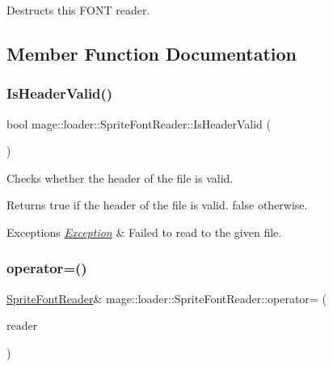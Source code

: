 Destructs this F\+O\+NT reader. 

\subsection{Member Function Documentation}
\hypertarget{classmage_1_1loader_1_1_sprite_font_reader_a6e8d452944d4a87a8e6f89ea6d4212f0}{}\label{classmage_1_1loader_1_1_sprite_font_reader_a6e8d452944d4a87a8e6f89ea6d4212f0} 
\subsubsection{\texorpdfstring{Is\+Header\+Valid()}{IsHeaderValid()}}
{\footnotesize\ttfamily bool mage\+::loader\+::\+Sprite\+Font\+Reader\+::\+Is\+Header\+Valid (\begin{DoxyParamCaption}{ }\end{DoxyParamCaption})\hspace{0.3cm}{\ttfamily [private]}}

Checks whether the header of the file is valid.

\begin{DoxyReturn}{Returns}
{\ttfamily true} if the header of the file is valid. {\ttfamily false} otherwise. 
\end{DoxyReturn}

\begin{DoxyExceptions}{Exceptions}
{\em \hyperlink{classmage_1_1_exception}{Exception}} & Failed to read to the given file. \\
\hline
\end{DoxyExceptions}
\hypertarget{classmage_1_1loader_1_1_sprite_font_reader_a65ddea9d2f842f2e6d81c3f4dccb62a6}{}\label{classmage_1_1loader_1_1_sprite_font_reader_a65ddea9d2f842f2e6d81c3f4dccb62a6} 
\subsubsection{\texorpdfstring{operator=()}{operator=()}\hspace{0.1cm}{\footnotesize\ttfamily [1/2]}}
{\footnotesize\ttfamily \hyperlink{classmage_1_1loader_1_1_sprite_font_reader}{Sprite\+Font\+Reader}\& mage\+::loader\+::\+Sprite\+Font\+Reader\+::operator= (\begin{DoxyParamCaption}\item[{const \hyperlink{classmage_1_1loader_1_1_sprite_font_reader}{Sprite\+Font\+Reader} \&}]{reader }\end{DoxyParamCaption})\hspace{0.3cm}{\ttfamily [delete]}}

